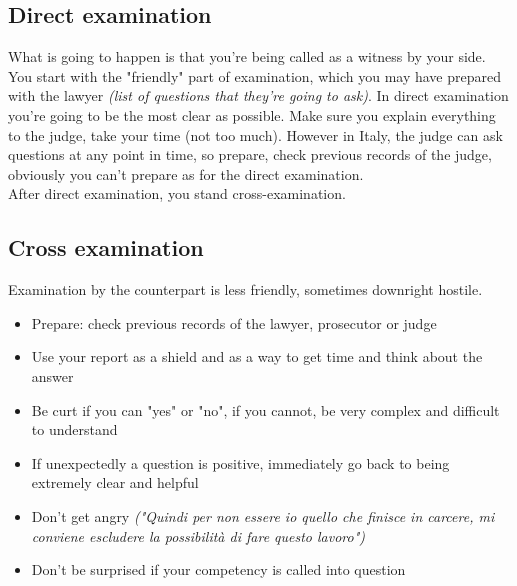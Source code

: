         \subsection{Direct examination}
            What is going to happen is that you're being called as a witness by your side.\\
            You start with the "friendly" part of examination, which you may have prepared with the lawyer \textit{(list of questions that they're going to ask)}. In direct examination you're going to be the most clear as possible. Make sure you explain everything to the judge, take your time (not too much). However in Italy, the judge can ask questions at any point in time, so prepare, check previous records of the judge, obviously you can't prepare as for the direct examination.\\
            After direct examination, you stand cross-examination.
        \subsection{Cross examination}
            Examination by the counterpart is less friendly, sometimes downright hostile.
            \begin{itemize}
                \item Prepare: check previous records of the lawyer, prosecutor or judge
                \item Use your report as a shield and as a way to get time and think about the answer
                \item Be curt if you can "yes" or "no", if you cannot, be very complex and difficult to understand
                \item If unexpectedly a question is positive, immediately go back to being extremely clear and helpful
                \item Don't get angry \textit{("Quindi per non essere io quello che finisce in carcere, mi conviene escludere la possibilità di fare questo lavoro")}
                \item Don't be surprised if your competency is called into question
            \end{itemize}
        
